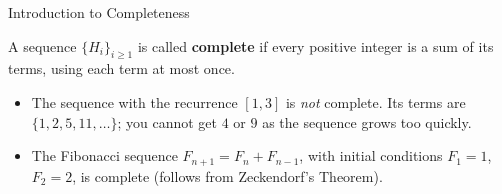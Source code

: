 \documentclass{beamer}
\begin{document}
\begin{frame}{Introduction to Completeness}
    \begin{definition}
        A sequence $\{H_i\}_{i \ge 1}$ is called \textbf{complete} if every positive integer is a sum of its terms, using each term at most once.
    \end{definition}
    \medskip
    \begin{itemize}
    \pause
     \item The sequence with the recurrence $[1, 3]$ is \emph{not} complete. Its terms are $\{1,2,5,11,\dots\}$; you cannot get $4$ or $9$ as the sequence grows too quickly.\medskip
    \pause
    \item The Fibonacci sequence $F_{n + 1} = F_n + F_{n - 1}$, with initial conditions $F_1 = 1$, $F_2 = 2$, is complete (follows from Zeckendorf's Theorem).
    \end{itemize}
    
    
\end{frame}
\end{document}
